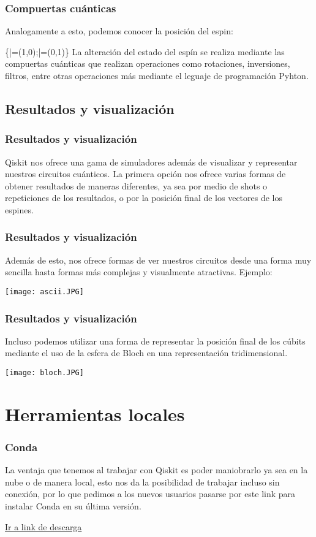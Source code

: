 \documentclass[spanish]{beamer}
\begin{document}
\newpage\justify
\begin{frame}
\frametitle{Compuertas cuánticas}

Analogamente a esto, podemos conocer la posición del espin:

\centering\displaystyle \left\{|\uparrow \rangle =(1,0);|\downarrow \rangle =(0,1)\right\}
\justify
La alteración del estado del espín se realiza mediante las compuertas cuánticas que realizan operaciones como rotaciones, inversiones, filtros, entre otras operaciones más mediante el leguaje de programación Pyhton.
\end{frame}

\newpage\justify
\begin{frame}\subsection{Resultados y visualización}
\frametitle{Resultados y visualización}
Qiskit nos ofrece una gama de simuladores además de visualizar y representar nuestros circuitos cuánticos. La primera opción nos ofrece varias formas de obtener resultados de maneras diferentes, ya sea por medio de shots o repeticiones de los resultados, o por la posición final de los vectores de los espines.
\end{frame}

\newpage\justify
\begin{frame}
\frametitle{Resultados y visualización}
Además de esto, nos ofrece formas de ver nuestros circuitos desde una forma muy sencilla hasta formas más complejas y visualmente atractivas. Ejemplo:

\centering\texttt{[image: ascii.JPG]}
\end{frame}

\newpage\justify
\begin{frame}
\frametitle{Resultados y visualización}
Incluso podemos utilizar una forma de representar la posición final de los cúbits mediante el uso de la esfera de Bloch en una representación tridimensional.

\centering\texttt{[image: bloch.JPG]}
\end{frame}
\section{Herramientas locales}        
 \setlength{\parskip}{1mm}
 \begin{frame}[fragile]
 \frametitle{Conda} 
 \justify 
La ventaja que tenemos al trabajar con Qiskit es poder maniobrarlo ya sea en la nube o de manera local, esto nos da la posibilidad de trabajar incluso sin conexión, por lo que pedimos a los nuevos usuarios pasarse por este link para instalar Conda en su última versión.
 
\href{https://conda.io/projects/conda/en/latest/user-guide/install/index.html}{\textcolor{QMexicoPink}{Ir a link de descarga}}
\end{frame}
\end{document}

